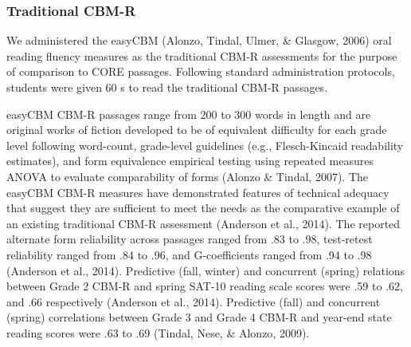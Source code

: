 \documentclass[
  english,
  man, fleqn, noextraspace]{apa6}
\begin{document}
\hypertarget{traditional-cbm-r}{%
\subsubsection{Traditional CBM-R}\label{traditional-cbm-r}}

We administered the easyCBM (Alonzo, Tindal, Ulmer, \& Glasgow, 2006) oral reading fluency measures as the traditional CBM-R assessments for the purpose of comparison to CORE passages. Following standard administration protocols, students were given 60 s to read the traditional CBM-R passages.

easyCBM CBM-R passages range from 200 to 300 words in length and are original works of fiction developed to be of equivalent difficulty for each grade level following word-count, grade-level guidelines (e.g., Flesch-Kincaid readability estimates), and form equivalence empirical testing using repeated measures ANOVA to evaluate comparability of forms (Alonzo \& Tindal, 2007). The easyCBM CBM-R measures have demonstrated features of technical adequacy that suggest they are sufficient to meet the needs as the comparative example of an existing traditional CBM-R assessment (Anderson et al., 2014). The reported alternate form reliability across passages ranged from .83 to .98, test-retest reliability ranged from .84 to .96, and G-coefficients ranged from .94 to .98 (Anderson et al., 2014). Predictive (fall, winter) and concurrent (spring) relations between Grade 2 CBM-R and spring SAT-10 reading scale scores were .59 to .62, and .66 respectively (Anderson et al., 2014). Predictive (fall) and concurrent (spring) correlations between Grade 3 and Grade 4 CBM-R and year-end state reading scores were .63 to .69 (Tindal, Nese, \& Alonzo, 2009).
\end{document}
